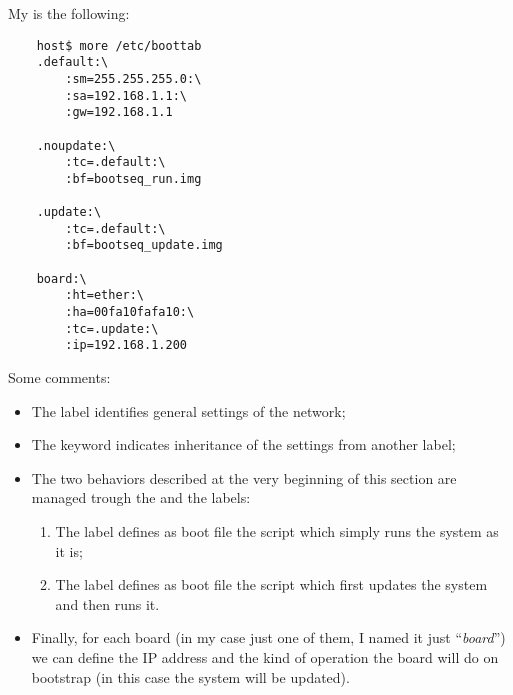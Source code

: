         My  is the following:
\begin{lstlisting}
    host$ more /etc/boottab
    .default:\
        :sm=255.255.255.0:\
        :sa=192.168.1.1:\
        :gw=192.168.1.1

    .noupdate:\
        :tc=.default:\
        :bf=bootseq_run.img

    .update:\
        :tc=.default:\
        :bf=bootseq_update.img

    board:\
        :ht=ether:\
        :ha=00fa10fafa10:\
        :tc=.update:\
        :ip=192.168.1.200
\end{lstlisting}

        Some comments:
        \begin{itemize}

        \item   The  label identifies general settings of
                the network;

        \item   The  keyword indicates inheritance of the
                settings from another label;

        \item   The two behaviors described at the very beginning of this
                section are managed trough the  and the
                 labels:

            \begin{enumerate}
            \item   The \Const{.noupdate} label defines as boot file the
                    script which simply runs the system as it is;
            \item   The  label defines as boot file the
                    script which first updates the system and then runs
                    it.
            \end{enumerate}

        \item   Finally, for each board (in my case just one of
                them, I named it just ``\emph{board}'') we can define the
                IP address and the kind of operation the board will do on
                bootstrap (in this case the system will be updated).

        \end{itemize}


